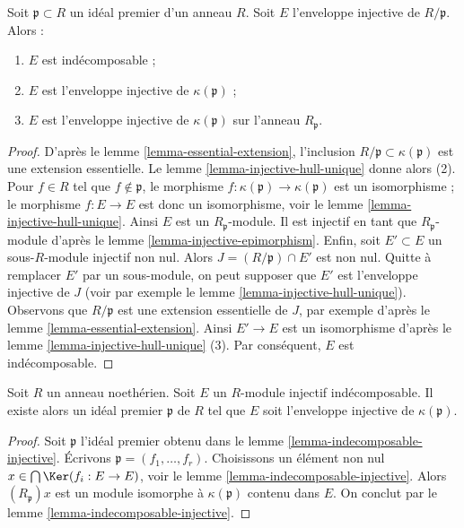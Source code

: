 \begin{lemma}
\label{lemma-injective-hull-indecomposable}
Soit $\mathfrak p \subset R$ un idéal premier d'un anneau $R$.
Soit $E$ l'enveloppe injective de $R/\mathfrak p$. Alors :
\begin{enumerate}
\item $E$ est indécomposable ;
\item $E$ est l'enveloppe injective de $\kappa(\mathfrak p)$ ;
\item $E$ est l'enveloppe injective de $\kappa(\mathfrak p)$ sur l'anneau $R_\mathfrak p$.
\end{enumerate}
\end{lemma}

\begin{proof}
D'après le lemme \ref{lemma-essential-extension}, l'inclusion $R/\mathfrak p \subset \kappa(\mathfrak p)$ est une extension essentielle.
Le lemme \ref{lemma-injective-hull-unique} donne alors (2).
Pour $f \in R$ tel que $f \not \in \mathfrak p$, le morphisme $f : \kappa(\mathfrak p) \to \kappa(\mathfrak p)$ est un isomorphisme ;
le morphisme $f : E \to E$ est donc un isomorphisme, voir le lemme \ref{lemma-injective-hull-unique}.
Ainsi $E$ est un $R_\mathfrak p$-module. Il est injectif en tant que
$R_\mathfrak p$-module d'après le lemme \ref{lemma-injective-epimorphism}.
Enfin, soit $E' \subset E$ un sous-$R$-module injectif non nul.
Alors $J = (R/\mathfrak p) \cap E'$ est non nul. Quitte à remplacer $E'$ par un sous-module,
on peut supposer que $E'$ est l'enveloppe injective de $J$
(voir par exemple le lemme \ref{lemma-injective-hull-unique}).
Observons que $R/\mathfrak p$ est une extension essentielle de $J$,
par exemple d'après le lemme \ref{lemma-essential-extension}. Ainsi $E' \to E$
est un isomorphisme d'après le lemme \ref{lemma-injective-hull-unique} (3).
Par conséquent, $E$ est indécomposable.
\end{proof}

\begin{lemma}
\label{lemma-indecomposable-injective-noetherian}
Soit $R$ un anneau noethérien. Soit $E$ un $R$-module injectif
indécomposable. Il existe alors un idéal premier $\mathfrak p$ de $R$
tel que $E$ soit l'enveloppe injective de $\kappa(\mathfrak p)$.
\end{lemma}

\begin{proof}
Soit $\mathfrak p$ l'idéal premier obtenu dans le lemme \ref{lemma-indecomposable-injective}.
Écrivons $\mathfrak p = (f_1, \ldots, f_r)$.
Choisissons un élément non nul $x \in \bigcap \Ker(f_i : E \to E)$, voir le lemme \ref{lemma-indecomposable-injective}.
Alors $(R_\mathfrak p)x$ est un module isomorphe à $\kappa(\mathfrak p)$ contenu dans $E$.
On conclut par le lemme \ref{lemma-indecomposable-injective}.
\end{proof}

